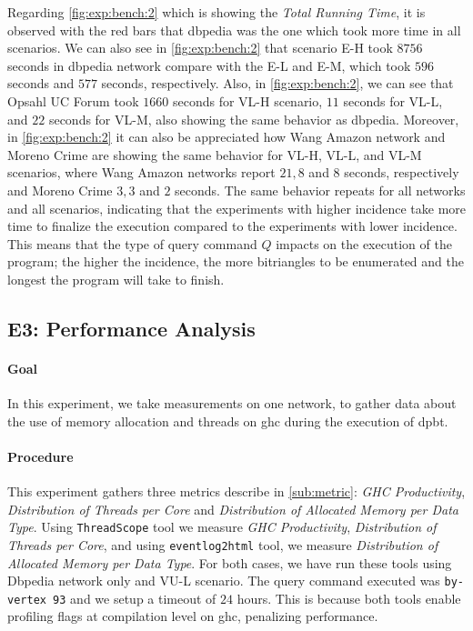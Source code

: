 Regarding \autoref{fig:exp:bench:2} which is showing the \emph{Total Running Time}, it is observed with the red bars that \acrshort{dbpedia} was the one which took more time in all scenarios.
We can also see in \autoref{fig:exp:bench:2} that scenario E-H took $8756$ seconds in \acrshort{dbpedia} network compare with the E-L and E-M, which took $596$ seconds and $577$ seconds, respectively. 
Also, in \autoref{fig:exp:bench:2}, we can see that Opsahl UC Forum took $1660$ seconds for VL-H scenario, $11$ seconds for VL-L, and $22$ seconds for VL-M, also showing the same behavior as \acrshort{dbpedia}.
Moreover, in \autoref{fig:exp:bench:2} it can also be appreciated how Wang Amazon network and Moreno Crime are showing the same behavior for VL-H, VL-L, and VL-M scenarios, where Wang Amazon networks report $21, 8$ and $8$ seconds, respectively and Moreno Crime $3, 3$ and $2$ seconds.
The same behavior repeats for all networks and all scenarios, indicating that the experiments with higher incidence take more time to finalize the execution compared to the experiments with lower incidence. This means that the type of query command $Q$ impacts on the execution of the program; the higher the incidence, the more bitriangles to be enumerated and the longest the program will take to finish.

\subsection{E3: Performance Analysis}\label{sub:sec:exp-3} 
\paragraph{Goal} In this experiment, we take measurements on one network, to gather data about the use of memory allocation and threads on \acrshort{ghc} during the execution of \acrshort{dpbt}.

\paragraph{Procedure} This experiment gathers three metrics describe in \autoref{sub:metric}: \emph{GHC Productivity}, \emph{Distribution of Threads per Core} and \emph{Distribution of Allocated Memory per Data Type}.
Using \texttt{ThreadScope} \cite{threadscope} tool we measure \emph{GHC Productivity}, \emph{Distribution of Threads per Core}, and using \texttt{eventlog2html} \cite{eventlog2html} tool, we measure \emph{Distribution of Allocated Memory per Data Type}.
For both cases, we have run these tools using Dbpedia network only and VU-L scenario. The query command executed was \texttt{by-vertex 93} and we setup a timeout of $24$ hours. 
This is because both tools enable profiling flags at compilation level on \acrshort{ghc}, penalizing performance.

